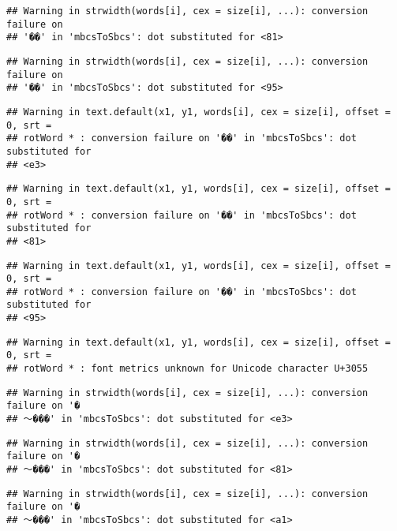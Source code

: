 \documentclass[]{article}
\begin{document}
\begin{verbatim}
## Warning in strwidth(words[i], cex = size[i], ...): conversion failure on
## '��' in 'mbcsToSbcs': dot substituted for <81>
\end{verbatim}

\begin{verbatim}
## Warning in strwidth(words[i], cex = size[i], ...): conversion failure on
## '��' in 'mbcsToSbcs': dot substituted for <95>
\end{verbatim}

\begin{verbatim}
## Warning in text.default(x1, y1, words[i], cex = size[i], offset = 0, srt =
## rotWord * : conversion failure on '��' in 'mbcsToSbcs': dot substituted for
## <e3>
\end{verbatim}

\begin{verbatim}
## Warning in text.default(x1, y1, words[i], cex = size[i], offset = 0, srt =
## rotWord * : conversion failure on '��' in 'mbcsToSbcs': dot substituted for
## <81>
\end{verbatim}

\begin{verbatim}
## Warning in text.default(x1, y1, words[i], cex = size[i], offset = 0, srt =
## rotWord * : conversion failure on '��' in 'mbcsToSbcs': dot substituted for
## <95>
\end{verbatim}

\begin{verbatim}
## Warning in text.default(x1, y1, words[i], cex = size[i], offset = 0, srt =
## rotWord * : font metrics unknown for Unicode character U+3055
\end{verbatim}

\begin{verbatim}
## Warning in strwidth(words[i], cex = size[i], ...): conversion failure on '�
## ～���' in 'mbcsToSbcs': dot substituted for <e3>
\end{verbatim}

\begin{verbatim}
## Warning in strwidth(words[i], cex = size[i], ...): conversion failure on '�
## ～���' in 'mbcsToSbcs': dot substituted for <81>
\end{verbatim}

\begin{verbatim}
## Warning in strwidth(words[i], cex = size[i], ...): conversion failure on '�
## ～���' in 'mbcsToSbcs': dot substituted for <a1>
\end{verbatim}
\end{document}
